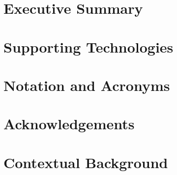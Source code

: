 \documentclass[ %
                author={Ainsley Rutterford},
                supervisor={Dr. Tilo Burghardt},
                degree={MEng},
                title={Volumetric Coral Analysis using Deep Learning},
                subtitle={},
                type={research},
                year={2020} ]{dissertation}
\begin{document}

\maketitle


\frontmatter


\makedecl


\tableofcontents

\chapter*{Executive Summary}


\chapter*{Supporting Technologies}


\chapter*{Notation and Acronyms}


\chapter*{Acknowledgements}


\mainmatter

\chapter{Contextual Background}
\label{chap:context}

\end{document}

